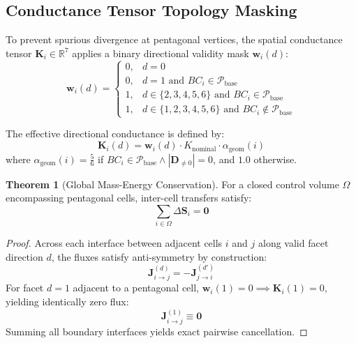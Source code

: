 \documentclass[10pt,twocolumn,a4paper]{article}
\theoremstyle{definition}
\newtheorem{theorem}{Theorem}
\begin{document}
\subsection{Conductance Tensor Topology Masking}
To prevent spurious divergence at pentagonal vertices, the spatial conductance tensor $\mathbf{K}_i \in \mathbb{R}^7$ applies a binary directional validity mask $\mathbf{w}_i(d)$:
\begin{equation}
\mathbf{w}_i(d) = \begin{cases} 
0, & d = 0 \\
0, & d = 1 \text{ and } BC_i \in \mathcal{P}_{\text{base}} \\
1, & d \in \{2, 3, 4, 5, 6\} \text{ and } BC_i \in \mathcal{P}_{\text{base}} \\
1, & d \in \{1, 2, 3, 4, 5, 6\} \text{ and } BC_i \notin \mathcal{P}_{\text{base}}
\end{cases}
\end{equation}

The effective directional conductance is defined by:
\begin{equation}
\mathbf{K}_i(d) = \mathbf{w}_i(d) \cdot K_{\text{nominal}} \cdot \alpha_{\text{geom}}(i)
\end{equation}
where $\alpha_{\text{geom}}(i) = \frac{5}{6}$ if $BC_i \in \mathcal{P}_{\text{base}} \wedge |\mathbf{D}_{\neq 0}| = 0$, and $1.0$ otherwise.

\begin{theorem}[Global Mass-Energy Conservation]
For a closed control volume $\Omega$ encompassing pentagonal cells, inter-cell transfers satisfy:
\begin{equation}
\sum_{i \in \Omega} \Delta \mathbf{S}_i = \mathbf{0}
\end{equation}
\end{theorem}
\begin{proof}
Across each interface between adjacent cells $i$ and $j$ along valid facet direction $d$, the fluxes satisfy anti-symmetry by construction:
\begin{equation}
\mathbf{J}_{i \to j}^{(d)} = - \mathbf{J}_{j \to i}^{(d')}
\end{equation}
For facet $d=1$ adjacent to a pentagonal cell, $\mathbf{w}_i(1) = 0 \implies \mathbf{K}_i(1) = 0$, yielding identically zero flux:
\begin{equation}
\mathbf{J}_{i \to j}^{(1)} \equiv \mathbf{0}
\end{equation}
Summing all boundary interfaces yields exact pairwise cancellation.
\end{proof}
\end{document}
